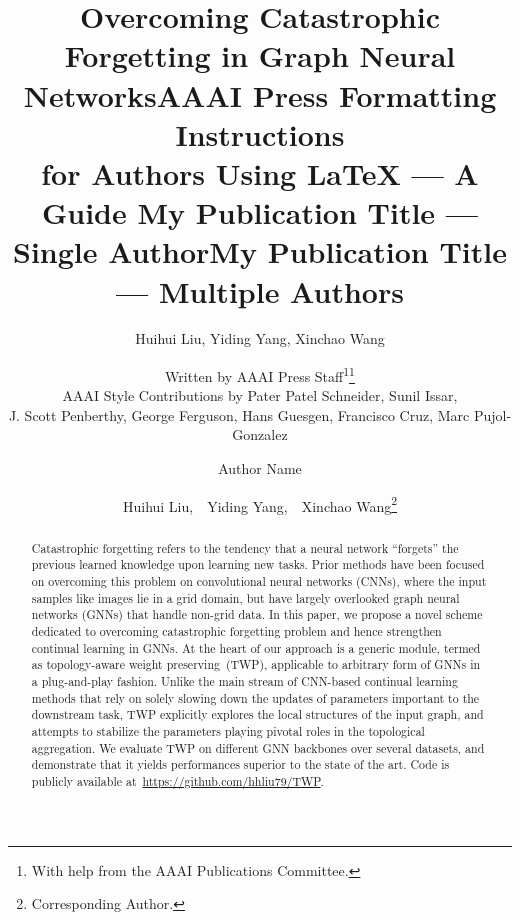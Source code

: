 \documentclass[letterpaper]{article} %
\title{Overcoming Catastrophic Forgetting in Graph Neural Networks}
\author{
    Huihui Liu, Yiding Yang, Xinchao Wang \\
}
\title{AAAI Press Formatting Instructions \\for Authors Using \LaTeX{} --- A Guide }
\author{

    Written by AAAI Press Staff\textsuperscript{\rm 1}\thanks{With help from the AAAI Publications Committee.}\\
    AAAI Style Contributions by Pater Patel Schneider,
    Sunil Issar,  \\
    J. Scott Penberthy,
    George Ferguson,
    Hans Guesgen,
    Francisco Cruz,
    Marc Pujol-Gonzalez
    \\
}
\title{My Publication Title --- Single Author}
\author {
    Author Name \\
}
\title{My Publication Title --- Multiple Authors}
\author {
        Huihui Liu, \,\, %
        Yiding Yang, \,\, %
        Xinchao Wang\footnote{Corresponding Author.}\\ %
}
\begin{document}

\maketitle

\begin{abstract}
Catastrophic forgetting refers to the tendency that 
a neural network ``forgets'' the previous learned 
knowledge upon learning new tasks.
Prior methods have been focused on overcoming this problem 
on convolutional neural networks (CNNs), where the input samples 
like images lie in a grid domain, but have largely overlooked 
graph neural networks (GNNs) that handle non-grid data.
In this paper, we propose a novel scheme 
dedicated to overcoming catastrophic forgetting problem and 
hence strengthen continual learning in GNNs.
At the heart of our approach is a generic module,
termed as topology-aware weight preserving~(TWP),
applicable to arbitrary form of GNNs in a plug-and-play fashion.
Unlike the main stream of CNN-based continual learning methods
that rely on solely slowing down the updates of
parameters important to the downstream task,
TWP explicitly explores the local structures of the input graph,
and attempts to stabilize the parameters playing 
pivotal roles in the topological aggregation. 
We evaluate TWP on different GNN backbones over several datasets, 
and demonstrate that it yields performances
superior to the state of the art.
Code is publicly available at~\url{https://github.com/hhliu79/TWP}. 



\end{abstract}
  
\end{document}
